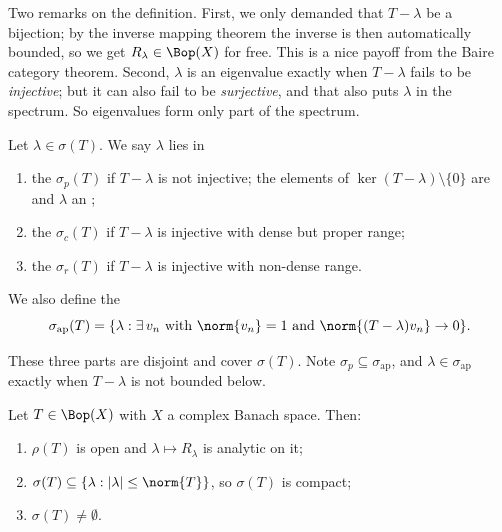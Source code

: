 Two remarks on the definition. First, we only demanded that $T - \lambda$ be a bijection; by the inverse mapping theorem the inverse is then automatically bounded, so we get $R_\lambda \in \Bop(X)$ for free. This is a nice payoff from the Baire category theorem. Second, $\lambda$ is an eigenvalue exactly when $T - \lambda$ fails to be \emph{injective}; but it can also fail to be \emph{surjective}, and that also puts $\lambda$ in the spectrum. So eigenvalues form only part of the spectrum.

\begin{definition}
	Let $\lambda\in\sigma(T)$. We say $\lambda$ lies in
	\begin{enumerate}[label=(\roman*)]
		\item the  $\sigma_p(T)$ if $T-\lambda$ is not injective; the elements of $\ker(T-\lambda)\setminus\{0\}$ are  and $\lambda$ an ;
		\item the  $\sigma_c(T)$ if $T-\lambda$ is injective with dense but proper range;
		\item the  $\sigma_r(T)$ if $T-\lambda$ is injective with non-dense range.
	\end{enumerate}
	We also define the 
	$$\sigma_{\mathrm{ap}}(T) = \{ \lambda : \exists\, v_n \text{ with } \norm{v_n}=1 \text{ and } \norm{(T-\lambda)v_n}\to0 \}.$$
\end{definition}

These three parts are disjoint and cover $\sigma(T)$. Note $\sigma_p \subseteq \sigma_{\mathrm{ap}}$, and $\lambda \in \sigma_{\mathrm{ap}}$ exactly when $T - \lambda$ is not bounded below.

\begin{theorem}
	Let $T \in \Bop(X)$ with $X$ a complex Banach space. Then:
	\begin{enumerate}[label=(\roman*)]
		\item $\rho(T)$ is open and $\lambda\mapsto R_\lambda$ is analytic on it;
		\item $\sigma(T)\subseteq\{\lambda : |\lambda|\leq\norm{T}\}$, so $\sigma(T)$ is compact;
		\item $\sigma(T)\neq\emptyset$.
	\end{enumerate}
\end{theorem}

